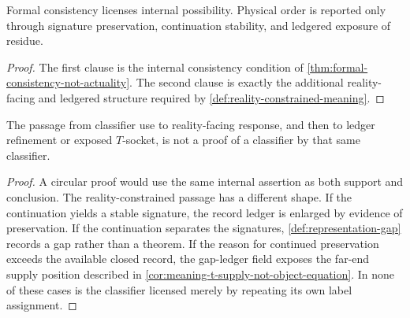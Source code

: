 \begin{corollary}
\label{cor:logic-possibility-not-physical-order}
Formal consistency licenses internal possibility. Physical order is
reported only through signature preservation, continuation stability,
and ledgered exposure of residue.
\end{corollary}
\begin{proof}
The first clause is the internal consistency condition of
\autoref{thm:formal-consistency-not-actuality}. The second clause is
exactly the additional reality-facing and ledgered structure required
by \autoref{def:reality-constrained-meaning}.
\end{proof}

\begin{theorem}
\label{thm:meaning-supply-loop-not-circular-proof}
The passage from classifier use to reality-facing response, and then
to ledger refinement or exposed $T$-socket, is not a proof of a
classifier by that same classifier.
\end{theorem}
\begin{proof}
A circular proof would use the same internal assertion as both support
and conclusion. The reality-constrained passage has a different
shape. If the continuation yields a stable signature, the record
ledger is enlarged by evidence of preservation. If the continuation
separates the signatures, \autoref{def:representation-gap} records a
gap rather than a theorem. If the reason for continued preservation
exceeds the available closed record, the gap-ledger field exposes the
far-end supply position described in
\autoref{cor:meaning-t-supply-not-object-equation}. In none of these
cases is the classifier licensed merely by repeating its own label
assignment.
\end{proof}


